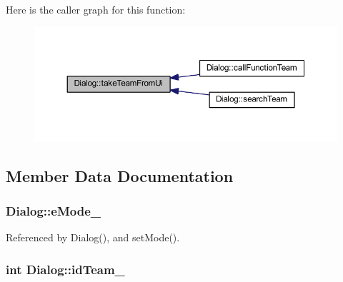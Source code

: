 Here is the caller graph for this function\+:\nopagebreak
\begin{figure}[H]
\begin{center}
\leavevmode
\includegraphics[width=350pt]{df/da9/class_dialog_a03a550e5b4fa16614d27f8d4e2329e10_icgraph}
\end{center}
\end{figure}




\subsection{Member Data Documentation}
\hypertarget{class_dialog_a99d3ef596f183ccf2d69c3b465989102}{}
\subsubsection[{e\+Mode\+\_\+}]{ Dialog\+::e\+Mode\+\_\+\hspace{0.3cm}{\ttfamily [private]}}\label{class_dialog_a99d3ef596f183ccf2d69c3b465989102}


Referenced by Dialog(), and set\+Mode().

\hypertarget{class_dialog_af05db46d671e032a4e51e4068f32fb06}{}
\subsubsection[{id\+Team\+\_\+}]{\setlength{\rightskip}{0pt plus 5cm}int Dialog\+::id\+Team\+\_\+\hspace{0.3cm}{\ttfamily [private]}}\label{class_dialog_af05db46d671e032a4e51e4068f32fb06}
\hypertarget{class_dialog_a77bd4ac2499af67029f8f00d682ffde9}{}
